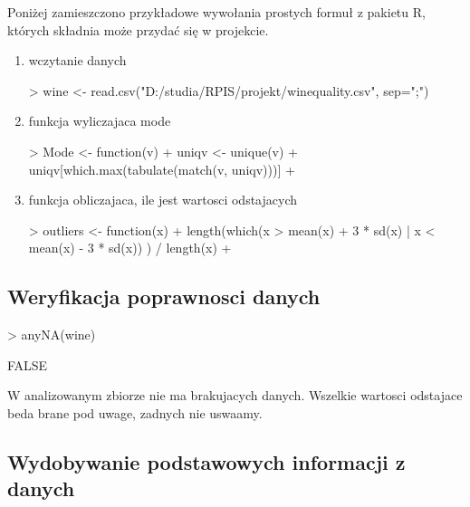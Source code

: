 \documentclass{article}
\begin{document}
Poniżej zamieszczono przykładowe wywołania prostych formuł z pakietu R, których składnia może przydać się w projekcie.
\begin{enumerate}
\item wczytanie danych
\begin{Schunk}
\begin{Sinput}
> wine <- read.csv("D:/studia/RPIS/projekt/winequality.csv", sep=";")
\end{Sinput}
\end{Schunk}

\item funkcja wyliczajaca mode
\begin{Schunk}
\begin{Sinput}
> Mode <- function(v) {
+   uniqv <- unique(v)
+   uniqv[which.max(tabulate(match(v, uniqv)))]
+ }
\end{Sinput}
\end{Schunk}

\item funkcja obliczajaca, ile jest wartosci odstajacych
\begin{Schunk}
\begin{Sinput}
> outliers <- function(x){
+   length(which(x >  mean(x) + 3 * sd(x) | x < mean(x) - 3 * sd(x))  ) / length(x)
+ }
\end{Sinput}
\end{Schunk}




\end{enumerate}

\subsection{Weryfikacja poprawnosci danych}
\begin{Schunk}
\begin{Sinput}
> anyNA(wine)
\end{Sinput}
\begin{Soutput}
[1] FALSE
\end{Soutput}
\end{Schunk}

W analizowanym zbiorze nie ma brakujacych danych.
\newline
Wszelkie wartosci odstajace beda brane pod uwage, zadnych nie uswaamy.

\subsection{Wydobywanie podstawowych informacji z danych}
\end{document}
